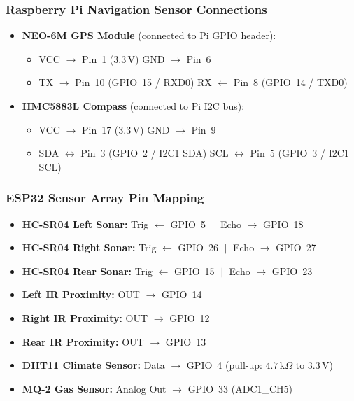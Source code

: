 \documentclass[conference]{IEEEtran}
\begin{document}
\subsubsection{Raspberry Pi Navigation Sensor Connections}
\begin{itemize}
    \item \textbf{NEO-6M GPS Module} (connected to Pi GPIO header):
    \begin{itemize}
        \item VCC $\longrightarrow$ Pin~1 ($3.3\,\text{V}$) \quad GND $\longrightarrow$ Pin~6
        \item TX $\longrightarrow$ Pin~10 (GPIO~15 / RXD0) \quad RX $\longleftarrow$ Pin~8 (GPIO~14 / TXD0)
    \end{itemize}
    \item \textbf{HMC5883L Compass} (connected to Pi I2C bus):
    \begin{itemize}
        \item VCC $\longrightarrow$ Pin~17 ($3.3\,\text{V}$) \quad GND $\longrightarrow$ Pin~9
        \item SDA $\longleftrightarrow$ Pin~3 (GPIO~2 / I2C1 SDA) \quad SCL $\longleftrightarrow$ Pin~5 (GPIO~3 / I2C1 SCL)
    \end{itemize}
\end{itemize}

\subsubsection{ESP32 Sensor Array Pin Mapping}
\begin{itemize}
    \item \textbf{HC-SR04 Left Sonar:} Trig $\longleftarrow$ GPIO~5 $\;\vert\;$ Echo $\longrightarrow$ GPIO~18
    \item \textbf{HC-SR04 Right Sonar:} Trig $\longleftarrow$ GPIO~26 $\;\vert\;$ Echo $\longrightarrow$ GPIO~27
    \item \textbf{HC-SR04 Rear Sonar:} Trig $\longleftarrow$ GPIO~15 $\;\vert\;$ Echo $\longrightarrow$ GPIO~23
    \item \textbf{Left IR Proximity:} OUT $\longrightarrow$ GPIO~14
    \item \textbf{Right IR Proximity:} OUT $\longrightarrow$ GPIO~12
    \item \textbf{Rear IR Proximity:} OUT $\longrightarrow$ GPIO~13
    \item \textbf{DHT11 Climate Sensor:} Data $\longrightarrow$ GPIO~4 (pull-up: $4.7\,\text{k}\Omega$ to $3.3\,\text{V}$)
    \item \textbf{MQ-2 Gas Sensor:} Analog Out $\longrightarrow$ GPIO~33 (ADC1\_CH5)
\end{itemize}
\end{document}
